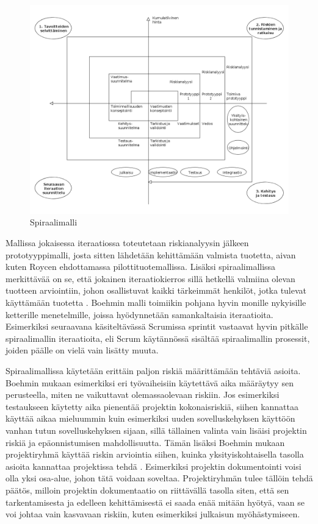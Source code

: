 \documentclass[finnish,nonumbib,nocopyright]{gradu2}
\begin{document}
\begin{figure}
\centering
\includegraphics[width=1.00\textwidth]{spiral}
\caption{Spiraalimalli \cite{managing}}
\end{figure}

Mallissa jokaisessa iteraatiossa toteutetaan riskianalyysin jälkeen prototyyppimalli, josta sitten lähdetään kehittämään valmista tuotetta, aivan kuten Roycen \cite{managing} ehdottamassa pilottituotemallissa. Lisäksi spiraalimallissa merkittävää on se, että jokainen iteraatiokierros sillä hetkellä valmiina olevan tuotteen arviointiin, johon osallistuvat kaikki tärkeimmät henkilöt, jotka tulevat käyttämään tuotetta \cite{spiral}. Boehmin malli toimiikin pohjana hyvin monille nykyisille ketterille menetelmille, joissa hyödynnetään samankaltaisia iteraatioita. Esimerkiksi seuraavana käsiteltävässä Scrumissa sprintit vastaavat hyvin pitkälle spiraalimallin iteraatioita, eli Scrum käytännössä sisältää spiraalimallin prosessit, joiden päälle on vielä vain lisätty muuta.

Spiraalimallissa käytetään erittäin paljon riskiä määrittämään tehtäviä asioita. Boehmin mukaan \cite{spiral} esimerkiksi eri työvaiheisiin käytettävä aika määräytyy sen perusteella, miten ne vaikuttavat olemassaolevaan riskiin. Jos esimerkiksi testaukseen käytetty aika pienentää projektin kokonaisriskiä, siihen kannattaa käyttää aikaa mieluummin kuin esimerkiksi uuden sovelluskehyksen käyttöön vanhan tutun sovelluskehyksen sijaan, sillä tällainen valinta vain lisäisi projektin riskiä ja epäonnistumisen mahdollisuutta. Tämän lisäksi Boehmin mukaan projektiryhmä käyttää riskin arviointia siihen, kuinka yksityiskohtaisella tasolla asioita kannattaa projektissa tehdä \cite{spiral}. Esimerkiksi projektin dokumentointi voisi olla yksi osa-alue, johon tätä voidaan soveltaa. Projektiryhmän tulee tällöin tehdä päätös, milloin projektin dokumentaatio on riittävällä tasolla siten, että sen tarkentamisesta ja edelleen kehittämisestä ei saada enää mitään hyötyä, vaan se voi johtaa vain kasvavaan riskiin, kuten esimerkiksi julkaisun myöhästymiseen.
\end{document}
